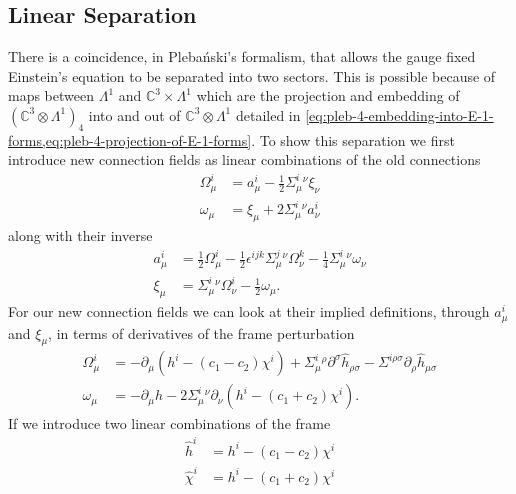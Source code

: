 \documentclass[10pt]{report}
\newcommand{\pleb}[0]{Pleba\'nski}
\theoremstyle{definition}
\newcommand{\C}[0]{\mathbb{C}}
\newcommand{\E}[0]{\C^3}
\begin{document}
        \subsection{Linear Separation}
        There is a coincidence, in \pleb{}'s formalism, that allows the gauge fixed Einstein's equation to be separated into two sectors. This is possible because of maps between $\Lambda^1$ and $\E \times \Lambda^1$ which are the projection and embedding of $(\C^3 \otimes \Lambda^1)_4$ into and out of $\C^3 \otimes \Lambda^1$ detailed in \cref{eq:pleb-4-embedding-into-E-1-forms,eq:pleb-4-projection-of-E-1-forms}. To show this separation we first introduce new connection fields as linear combinations of the old connections
        \begin{align}
            \Omega^i_\mu &= a^i_\mu - \frac{1}{2} \Sigma^i_\mu{}^\nu \xi_\nu \label{eq:lin-12-connection-in-a-xi}\\
            \omega_\mu &= \xi_\mu + 2 \Sigma^i_\mu{}^\nu a^i_\nu \label{eq:lin-4-connection-in-a-xi}
        \end{align}
        along with their inverse 
        \begin{align}
            a^i_\mu &= \frac{1}{2}\Omega^i_\mu - \frac{1}{2}\epsilon^{ijk} \Sigma^j_\mu{}^\nu \Omega^k_\nu - \frac{1}{4} \Sigma^i_\mu{}^\nu \omega_\nu \label{eq:lin-12-component-inverse-transformation}\\
            \xi_\mu &= \Sigma^i_\mu{}^\nu \Omega^i_\nu - \frac{1}{2}\omega_\mu \label{eq:lin-4-component-inverse-transformation}.
        \end{align}
        For our new connection fields we can look at their implied definitions, through $a^i_\mu$ and $\xi_\mu$, in terms of derivatives of the frame perturbation
        \begin{align}
            \Omega^i_\mu &= -\partial_\mu \left(  h^i - (c_1-c_2) \chi^i \right) + \Sigma^i_\mu{}^\rho \partial^\sigma \hat{h}_{\rho\sigma} - \Sigma^{i\rho\sigma} \partial_\rho \hat{h}_{\mu\sigma} \\  
            \omega_\mu &= - \partial_\mu h -2 \Sigma^i_\mu{}^\nu \partial_\nu \left( h^i - (c_1 + c_2) \chi^i \right).
        \end{align}
        If we introduce two linear combinations of the frame
        \begin{align}
        \hat{h}^i    &= h^i - (c_1 - c_2) \chi^i \label{eq:lin-hhat-i-new-linear-combiation}\\
        \hat{\chi}^i &= h^i - (c_1 + c_2) \chi^i \label{eq:lin-chihat-i-new-linear-combiation}
        \end{align}
\end{document}
